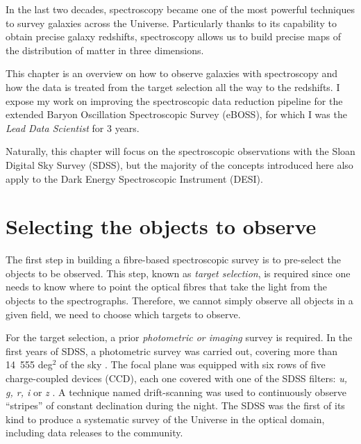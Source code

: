 \chaptertoc{}


\vspace{1em}

In the last two decades, spectroscopy became one of the most powerful
techniques to survey galaxies across the Universe. 
Particularly thanks to its capability to obtain precise galaxy redshifts, 
spectroscopy allows us to build precise maps of the distribution 
of matter in three dimensions. 

This chapter is an overview on how to observe galaxies with 
spectroscopy and how the data is treated from the target selection 
all the way to the redshifts. 
I expose my work on improving the spectroscopic
data reduction pipeline for the extended Baryon Oscillation 
Spectroscopic Survey (eBOSS), for which I was the \emph{Lead Data Scientist}
for 3 years. 

Naturally, this chapter will 
focus on the spectroscopic observations with the 
Sloan Digital Sky Survey (SDSS), but the majority of the 
concepts introduced here also apply to the Dark Energy 
Spectroscopic Instrument (DESI). 


\section{Selecting the objects to observe}
\label{spectro:target}

The first step in building a fibre-based spectroscopic survey is to pre-select the objects to be observed. 
This step, known as \emph{target selection}, is required since one needs to know where to point 
the optical fibres that take the light from the objects to the spectrographs.
Therefore, we cannot simply observe all objects in a given field, we need to choose which targets to observe.

For the target selection, a prior \emph{photometric or imaging} 
survey is required. In the first years of SDSS, a photometric
survey was carried out, covering more than 
14~555 deg$^2$ of the sky \cite{yorkSloanDigitalSky2000}. 
The focal plane was equipped with six rows of five 
charge-coupled devices (CCD), each one covered with one of 
the SDSS filters: \textit{u, g, r, i} or \textit{z} 
\cite{gunnSloanDigitalSky1998, doiPhotometricResponseFunctions2010}.
A technique named drift-scanning was used to continuously observe 
``stripes'' of constant declination during the night.
The SDSS was the first of its kind to produce a systematic survey 
of the Universe in the optical domain, including data releases to the community.


